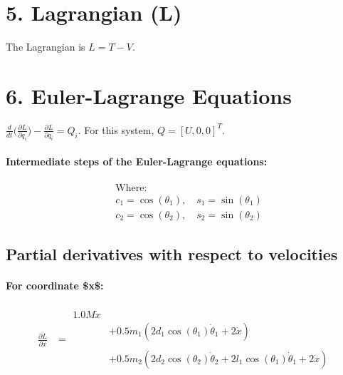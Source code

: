 \documentclass{article}%
\begin{document}
%
\section{5. Lagrangian (L)}%
\label{sec:5.Lagrangian(L)}%
The Lagrangian is $L = T - V$.

%
\section{6. Euler{-}Lagrange Equations}%
\label{sec:6.Euler{-}LagrangeEquations}%
$\frac{d}{dt}\bigl(\frac{\partial L}{\partial \dot{q}_i}\bigr) - \frac{\partial L}{\partial q_i} = Q_i$. For this system, $Q = [U, 0, 0]^T$.%
\paragraph{\textbf{Intermediate steps of the Euler{-}Lagrange equations:}}%
\label{para:textbfIntermediatestepsoftheEuler{-}Lagrangeequations}%

%
\begin{align*}%
&\text{Where: } \\%
&c_1 = \cos(\theta_1), \quad s_1 = \sin(\theta_1) \\%
&c_2 = \cos(\theta_2), \quad s_2 = \sin(\theta_2)%
\end{align*}%
\vspace{1em}%
\subsection{Partial derivatives with respect to velocities}%
\label{subsec:Partialderivativeswithrespecttovelocities}%
\paragraph{For coordinate \$x\$:}%
\label{para:Forcoordinatex}%

%
\begin{align*}%
\frac{\partial L}{\partial \dot{x}} &= \begin{aligned} \displaystyle 1.0 M \dot{x}  \\
& + 0.5 m_{1} \left(2 d_{1} \cos(\theta_1 ) \dot{\theta}_{1} + 2 \dot{x}\right) \\
&   \\
& + 0.5 m_{2} \left(2 d_{2} \cos(\theta_2 ) \dot{\theta}_{2} + 2 l_{1} \cos(\theta_1 ) \dot{\theta}_{1} + 2 \dot{x}\right)  \end{aligned} \\%
\end{align*}%
\end{document}

